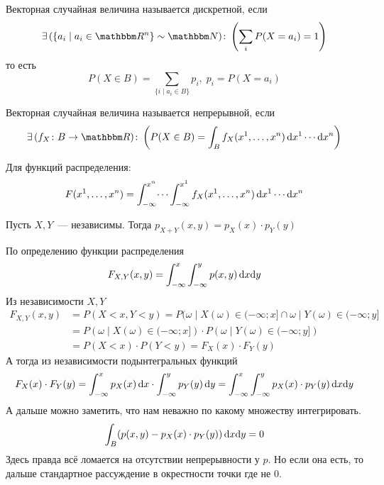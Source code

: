 \documentclass[12pt,timbord]{../../../notes}
\begin{document}
\begin{defn}\label{defn:stat::randvec::disc}
  Векторная случайная величина называется дискретной, если
  \[
    \exists\,(\{a_i\mid a_i \in \R^n \} \sim \N)\colon \left( \sum_{i} P(X = a_i) = 1 \right)
  \]
  то есть 
  \[
    P(X\in B) = \sum_{\{i\mid a_i\in B\}} p_i, \; p_i = P(X = a_i)
  \]
\end{defn}
\begin{defn}\label{defn:stat::randvec::cony}
  Векторная случайная величина называется непрерывной, если
  \[
    \exists\,(f_X\colon B\to \R )\colon \left( P(X\in B) = \int_{B} f_X(x^1, \dotsc, x^n)\, \del
    x^1 \dotsm \del x^n \right)
  \]
\end{defn}
\begin{rem}\label{rem:stat::randvec::distfun }
  Для функций распределения:
  \[
    F(x^1, \dotsc, x^n) = \int_{-\infty}^{x^n}\dotsi\int_{-\infty}^{x^1} f_X(x^1, \dotsc, x^n)\,
    \mathrm{d} x^1 \dotsm \mathrm{d} x^n 
  \]
\end{rem}

\begin{prop}\label{prop:stat::randvec::ind}
  Пусть $X, Y$~--- независимы. Тогда $p_{X+Y}(x,y)=p_X(x) \cdot p_Y(y)$
\end{prop}
\begin{itlproof}
  По определению функции распределения
  \[
    F_{X,Y}(x,y) = \int_{-\infty}^x\int_{-\infty}^y p(x,y) \, \mathrm{d} x\mathrm{d} y
  \]
  Из независимости $X,Y$
  \[
    \begin{split}
      F_{X,Y} (x,y) &= P(X<x,Y<y) = P({\omega\mid X(\omega)\in (-\infty;x]}\cap {\omega\mid
        Y(\omega)\in (-\infty;y]} \\
        &= P({\omega\mid X(\omega)\in (-\infty;x]})\cdot
        P({\omega\mid Y(\omega)\in (-\infty;y]}) \\
        &= P(X<x) \cdot P(Y<y) = F_X(x)\cdot F_Y(y)
      \end{split}
  \]
  А тогда из независимости подынтегральных функций
  \[
    F_X(x)\cdot F_Y(y) = \int_{-\infty}^x p_X(x) \, \mathrm{d} x \cdot \int_{-\infty}^y p_Y(y) \, \mathrm{d} y 
    = \int_{-\infty}^x\int_{-\infty}^y p_X(x)\cdot p_Y(y) \, \mathrm{d} x\mathrm{d} y
  \]
  А дальше можно заметить, что нам неважно по какому множеству интегрировать.
  \[
    \int_B (p(x,y) - p_X(x)\cdot p_Y(y)) \, \mathrm{d} x\mathrm{d} y = 0
  \]
  Здесь правда всё ломается на отсутствии непрерывности у $p$. Но если она есть, то дальше
  стандартное рассуждение в окрестности точки где не 0.
\end{itlproof}
\end{document}
